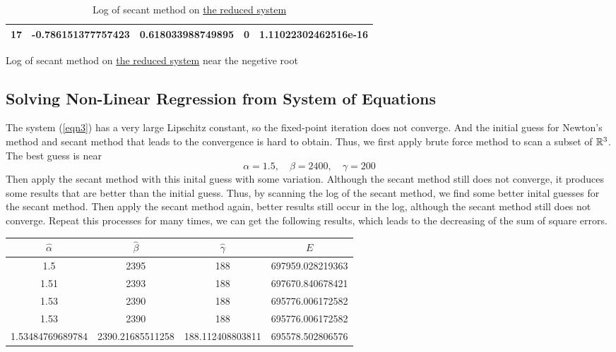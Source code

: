 \begin{table}[H]
\begin{table}[H]
\begin{table}[H]
\begin{table}[H]
\begin{table}[htbp]
\begin{subtable}[t]{\textwidth}
\begin{tabular}{|c|c|c|c|c|}
		17	&	\footnotesize	-0.786151377757423		&	\footnotesize	0.618033988749895	&	\footnotesize	0						&	\footnotesize	1.11022302462516e-16	\\	\hline
		\end{tabular}
		\caption{Log of secant method on \hyperref[eqn1reduce]{the reduced system} near the negetive root}
		\label{logeqn1se-}
	\end{subtable}
	\caption{Log of secant method on \hyperref[eqn1reduce]{the reduced system}}
	\label{logeqn1se}
	\end{table}



\subsection{Solving Non-Linear Regression from System of Equations}
The system (\ref{eqn3}) has a very large Lipschitz constant, so the fixed-point iteration does not converge.
And the initial guess for Newton's method and secant method that leads to the convergence is hard to obtain.
Thus, we first apply brute force method to scan a subset of \(\mathbb{R}^3\).
The best guess is near
\[ \alpha=1.5,\quad \beta=2400, \quad \gamma=200 \]
Then apply the secant method with this inital guess with some variation.
Although the secant method still does not converge, it produces some results that are better than the initial guess.
Thus, by scanning the log of the secant method, we find some better inital guesses for the secant method.
Then apply the secant method again, better results still occur in the log, although the secant method still does not converge.
Repeat this processes for many times, we can get the following results, which leads to the decreasing of the sum of square errors.
\ifnum{}
	\begin{table}[H]
\else
	\begin{table}[htbp]
\fi
	\centering
	\begin{tabular}{|c|c|c|c|}
	\hline
	\(\hat\alpha\)	&	\(\hat\beta\)	&	\(\hat\gamma\)	&	\hyperref[sse]{\(E\)}	\\	\hline
	1.5					&	2395				&	188					&	697959.028219363	\\	\hline	
	1.51				&	2393				&	188					&	697670.840678421	\\	\hline	
	1.53				&	2390				&	188					&	695776.006172582	\\	\hline	
	1.53				&	2390				&	188					&	695776.006172582	\\	\hline	
	1.53484769689784	&	2390.21685511258	&	188.112408803811	&	695578.502806576	\\	\hline	

\end{tabular}
\end{table}
\end{table}
\end{table}
\end{table}
\end{table}
\end{table}
